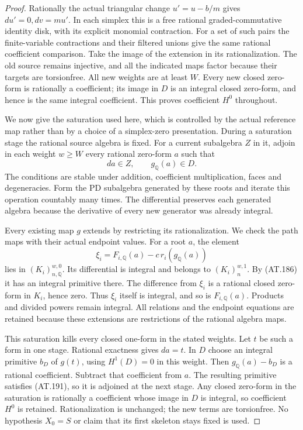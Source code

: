 \begin{proof}
Rationally the actual triangular change
$u'=u-b/m$ gives $du'=0,dv=mu'$.
In each simplex this is a free rational
graded-commutative identity disk, with its
explicit monomial contraction.
For a set of such pairs the finite-variable
contractions and their filtered unions give
the same rational coefficient comparison.
Take the image of the extension in its
rationalization. The old source remains
injective, and all the indicated maps factor
because their targets are torsionfree.
All new weights are at least $W$.
Every new closed zero-form is rationally a
coefficient; its image in $D$ is an integral
closed zero-form, and hence is the same
integral coefficient.
This proves coefficient $H^0$ throughout.

We now give the saturation used here, which is
controlled by the actual reference map rather
than by a choice of a simplex-zero presentation.
During a saturation stage the rational source
algebra is fixed.
For a current subalgebra $Z$ in it, adjoin
in each weight $w\geq W$ every rational
zero-form $a$ such that
\[
                   da\in Z,\qquad g_{\mathbb Q}(a)\in D.
 \tag{AT.191}
\]
The conditions are stable under addition,
coefficient multiplication, faces and
degeneracies. Form the PD subalgebra generated
by these roots and iterate this operation
countably many times.
The differential preserves each generated
algebra because the derivative of every
new generator was already integral.

Every existing map $g$ extends by restricting
its rationalization. We check the path maps
with their actual endpoint values.
For a root $a$, the element
\[
 \xi_i=F_{i,\mathbb Q}(a)
                     -c\,r_i(g_{\mathbb Q}(a))
 \tag{AT.192}
\]
lies in $(K_i)_{n,\mathbb Q}^{w,0}$.
Its differential is integral and belongs
to $(K_i)_n^{w,1}$.
By (AT.186) it has an integral primitive there.
The difference from $\xi_i$ is a rational
closed zero-form in $K_i$, hence zero.
Thus $\xi_i$ itself is integral, and so is
$F_{i,\mathbb Q}(a)$.
Products and divided powers remain integral.
All relations and the endpoint equations are
retained because these extensions are
restrictions of the rational algebra maps.

This saturation kills every closed one-form
in the stated weights. Let $t$ be such a form
in one stage. Rational exactness gives $da=t$.
In $D$ choose an integral primitive $b_D$ of
$g(t)$, using $H^1(D)=0$ in this weight.
Then $g_{\mathbb Q}(a)-b_D$ is a rational
coefficient. Subtract that coefficient from
$a$. The resulting primitive satisfies
(AT.191), so it is adjoined at the next stage.
Any closed zero-form in the saturation is
rationally a coefficient whose image in
$D$ is integral, so coefficient $H^0$ is
retained. Rationalization is unchanged;
the new terms are torsionfree.
No hypothesis $X_0=S$ or claim that its
first skeleton stays fixed is used.


\end{proof}
